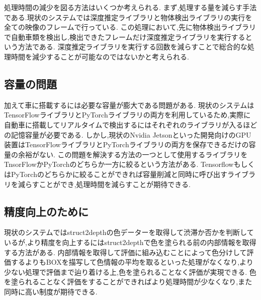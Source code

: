処理時間の減少を図る方法はいくつか考えられる.
まず,処理する量を減らす手法である.現状のシステムでは深度推定ライブラリと物体検出ライブラリの実行を全ての映像のフレームで行っている.
この処理において,先に物体検出ライブラリで自動車類を検出し,検出できたフレームだけ深度推定ライブラリを実行するという方法である.
深度推定ライブラリを実行する回数を減らすことで総合的な処理時間を減少することが可能なのではないかと考えられる.

\subsection{容量の問題}
加えて車に搭載するには必要な容量が膨大である問題がある.
現状のシステムはTensorFlowライブラリとPyTorchライブラリの両方を利用しているため,実際に自動車に搭載してリアルタイムで検出するにはそれぞれのライブラリが入るほどの記憶容量が必要である.
しかし,現状のNvidia Jetsonといった開発向けのGPU装置はTensorFlowライブラリとPyTorchライブラリの両方を保存できるだけの容量の余裕がない.
この問題を解決する方法の一つとして使用するライブラリをTnsorFlowかPyTorchのどちらか一方に絞るという方法がある.
TensorflowもしくはPyTorchのどちらかに絞ることができれば容量削減と同時に呼び出すライブラリを減らすことができ,処理時間を減らすことが期待できる.

\subsection{精度向上のために}
現状のシステムではstruct2depthの色データーを取得して渋滞か否かを判断しているが,より精度を向上するにはstruct2depthで色を塗られる前の内部情報を取得する方法がある.
内部情報を取得して評価に組み込むことによって色分けして評価するよりもBOXを描写して色情報の平均を取るといった処理がなくなり,より少ない処理で評価まで辿り着ける上,色を塗られることなく評価が実現できる.
色を塗られることなく評価をすることができればより処理時間が少なくなり,また同時に高い制度が期待できる.
